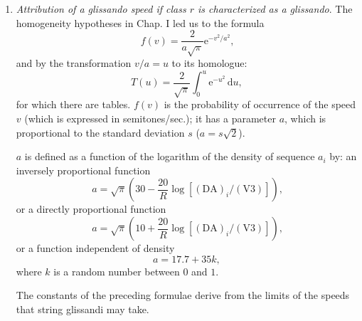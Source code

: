 \documentclass[letterpaper, 11pt]{article}
\begin{document}
\begin{enumerate}
        Just as for the density in 2., we accept a certain memory of or dependence on the preceding
        pitch played by the same instrument, so that we have
        \[ h_u = h_{u-1} \pm z \text{,} \]
        where \( z \) is given by the probability formula
        \[
            P_z = \frac{2}{s} \left( 1 - \frac{z}{s} \right) \, \mathrm{d}z.
            \tag{See \hyperref[sec:appendix]{Appendix I}.}
        \]
        \( P_z \) is the probability of the interval \( z \) taken at random from the range \( s \),
        and \( s \) is expressed as the difference between the highest and lowest pitches that can
        be played on the instrument.
    \item
        \textit{Attribution of a glissando speed if class \( r \) is characterized as a glissando}.
        The homogeneity hypotheses in Chap. I led us to the formula
        \[ f(v) = \frac{2}{a \sqrt{\pi}} \mathrm{e}^{-v^2/a^2} \text{,} \] and by the transformation
        \( v/a = u \) to its homologue:
        \[ T(u) = \frac{2}{\sqrt{\pi}} \int_0^u \mathrm{e}^{-u^2} \, \mathrm{d}u, \]
        for which there are tables. \( f(v) \) is the probability of occurrence of the speed \( v \)
        (which is expressed in semitones/sec.); it has a parameter \( a \), which is proportional to
        the standard deviation \( s \) (\( a = s \sqrt{2} \)).

        \( a \) is defined as a function of the logarithm of the density of sequence \( a_i \) by:
        an inversely proportional function
        \[ a = \sqrt{\pi} \left( 30 - \frac{20}{R} \log{[(\mathrm{DA})_i / (\mathrm{V3})]} \right) \text{,} \]
        or a directly proportional function
        \[ a = \sqrt{\pi} \left( 10 + \frac{20}{R} \log{[(\mathrm{DA})_i / (\mathrm{V3})]}\right) \text{,} \]
        or a function independent of density
        \[ a = 17.7 + 35k, \]
        where \( k \) is a random number between \( 0 \) and \( 1 \).

        The constants of the preceding formulae derive from the limits of the speeds that string
        glissandi may take.


\end{enumerate}
\end{document}
